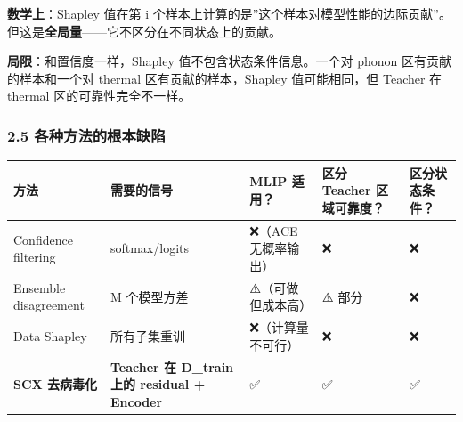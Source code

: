 \documentclass[
  12pt,
]{ctexart}
\begin{document}
\textbf{数学上}：Shapley 值在第 i
个样本上计算的是''这个样本对模型性能的边际贡献''。但这是\textbf{全局量}------它不区分在不同状态上的贡献。

\textbf{局限}：和置信度一样，Shapley 值不包含状态条件信息。一个对 phonon
区有贡献的样本和一个对 thermal 区有贡献的样本，Shapley 值可能相同，但
Teacher 在 thermal 区的可靠性完全不一样。

\subsubsection{2.5
各种方法的根本缺陷}\label{ux5404ux79cdux65b9ux6cd5ux7684ux6839ux672cux7f3aux9677}

\begin{longtable}[]{@{}
  >{\raggedright\arraybackslash}p{}
  >{\raggedright\arraybackslash}p{}
  >{\centering\arraybackslash}p{}
  >{\centering\arraybackslash}p{}
  >{\centering\arraybackslash}p{}@{}}
\toprule\noalign{}
\begin{minipage}[b]{\linewidth}\raggedright
方法
\end{minipage} & \begin{minipage}[b]{\linewidth}\raggedright
需要的信号
\end{minipage} & \begin{minipage}[b]{\linewidth}\centering
MLIP 适用？
\end{minipage} & \begin{minipage}[b]{\linewidth}\centering
区分 Teacher 区域可靠度？
\end{minipage} & \begin{minipage}[b]{\linewidth}\centering
区分状态条件？
\end{minipage} \\
\midrule\noalign{}
\endhead
\bottomrule\noalign{}
\endlastfoot
Confidence filtering & softmax/logits & ❌（ACE 无概率输出） & ❌ &
❌ \\
Ensemble disagreement & M 个模型方差 & ⚠️（可做但成本高） & ⚠️ 部分 &
❌ \\
Data Shapley & 所有子集重训 & ❌（计算量不可行） & ❌ & ❌ \\
\textbf{SCX 去病毒化} & \textbf{Teacher 在 D\_train 上的 residual +
Encoder} & ✅ & ✅ & ✅ \\
\end{longtable}
\end{document}
